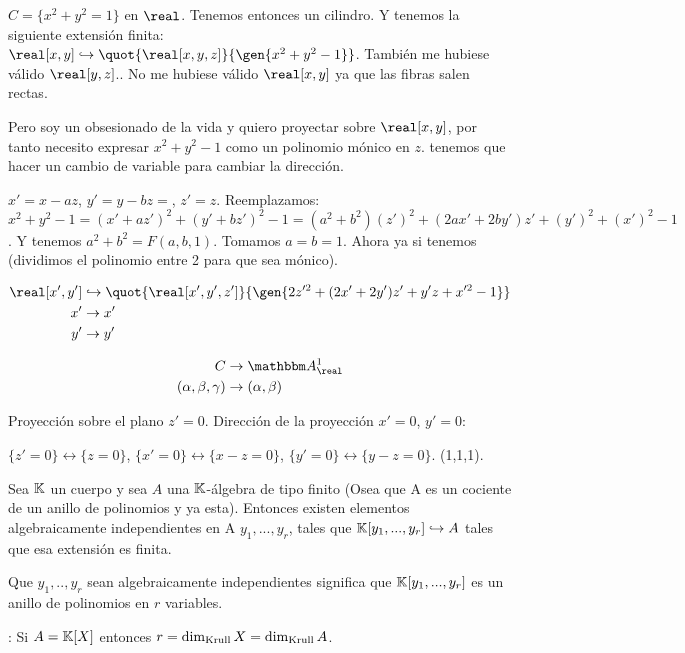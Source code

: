 \begin{example}
	$C=\{x^2+y^2=1\}$ en $\real$. Tenemos entonces un cilindro. Y  tenemos la siguiente extensión finita: $\real[x,y] \hookrightarrow \quot{\real[x,y,z]}{\gen{x^2+y^2-1}}$. También me hubiese válido $\real[y,z]$.. No me hubiese válido $\real[x,y]$ ya que las fibras salen rectas.
	
	Pero soy un obsesionado de la vida y quiero proyectar sobre $\real[x,y]$, por tanto necesito expresar $x^2+y^2-1$ como un polinomio mónico en $z$. tenemos que hacer un cambio de variable para cambiar la dirección.
	
	$x' = x-az$, $y'=y-bz=$, $z'=z$. Reemplazamos: $x^2+y^2-1=(x'+az')^2+(y'+bz')^2-1=(a^2+b^2)(z')^2+(2ax'+2by')z'+(y')^2+(x')^2-1$. Y tenemos $a^2+b^2=F(a,b,1)$. Tomamos $a=b=1$. Ahora ya si tenemos (dividimos el polinomio entre 2 para que sea mónico).
	
	\begin{align*}
		\real[x',y'] & \hookrightarrow \quot{\real[x',y',z']}{\gen{2z'^2+(2x'+2y')z'+y'z+x'^2-1}}\\
		x' & \rightarrow x' \\
		y' & \rightarrow y' 
	\end{align*}
	
	\begin{align*}
		C & \rightarrow \A^1_{\real}\\
		(\alpha, \beta, \gamma) & \rightarrow (\alpha, \beta) 
	\end{align*}
	
	Proyección sobre el plano $z'=0$. Dirección de la proyección $x'=0$, $y'=0$:
	
	$\{ z'=0 \} \leftrightarrow \{ z=0 \}$, $\{ x'=0 \} \leftrightarrow \{ x-z=0 \}$, $\{ y'=0 \} \leftrightarrow \{ y-z=0 \}$. (1,1,1).
\end{example}

\begin{theorem}
	Sea $\mathbb{K}$ un cuerpo y sea $A$ una $\mathbb{K}$-álgebra de tipo finito (Osea que A es un cociente de un anillo de polinomios y ya esta). Entonces existen elementos algebraicamente independientes en A $y_1,...,y_r$, tales que $\mathbb{K}[y_1,...,y_r] \hookrightarrow A$ tales que esa extensión es finita.
\end{theorem}

Que $y_1,..,y_r$ sean algebraicamente independientes significa que $\mathbb{K}[y_1,...,y_r]$ es un anillo de polinomios en $r$ variables.

\obs: Si $A=\mathbb{K}[X]$ entonces $r=\dim_{\mathrm{Krull}} X=\dim_{\mathrm{Krull}} A$.



